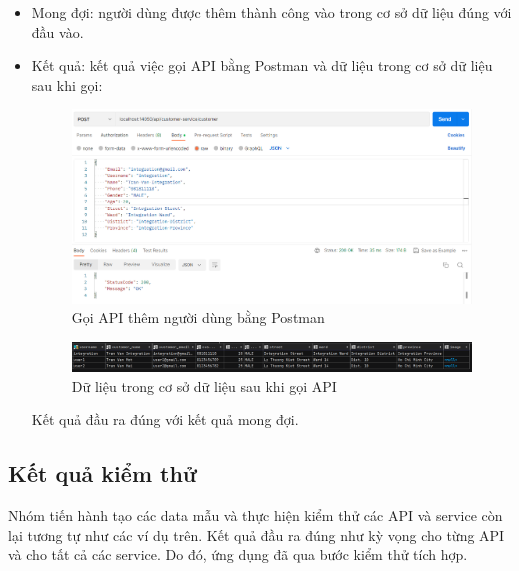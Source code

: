 \begin{itemize}
\begin{itemize}
\begin{figure}[!htp]
                    \end{figure}
              \item Mong đợi: người dùng được thêm thành công vào trong cơ sở dữ liệu đúng với đầu vào.
              \item Kết quả: kết quả việc gọi API bằng Postman và dữ liệu trong cơ sở dữ liệu sau khi gọi:\\

                    \begin{figure}[!htp]
                        \begin{center}
                            \includegraphics[width=15cm]{img/testing/inte_got_2.PNG}
                        \end{center}
                        \caption{Gọi API thêm người dùng bằng Postman}
                    \end{figure}
                    \begin{figure}[!htp]
                        \begin{center}
                            \includegraphics[width=15cm]{img/testing/inte_got_db_2.PNG}
                        \end{center}
                        \caption{Dữ liệu trong cơ sở dữ liệu sau khi gọi API}
                    \end{figure}
                    Kết quả đầu ra đúng với kết quả mong đợi.
          \end{itemize}
\end{itemize}

\subsection{Kết quả kiểm thử}
Nhóm tiến hành tạo các data mẫu và thực hiện kiểm thử các API và service còn lại tương tự như các ví dụ trên. Kết quả đầu ra đúng như kỳ vọng cho từng API và cho tất cả các service. Do đó, ứng dụng đã qua bước kiểm thử tích hợp.

